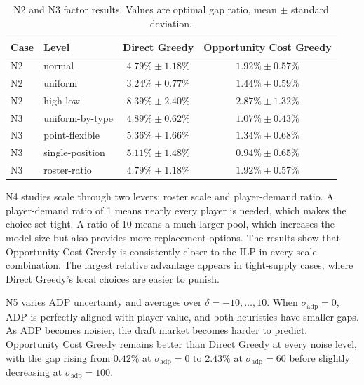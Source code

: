 \documentclass[10pt,a4paper]{article}
\begin{document}
\begin{table}[H]
\centering
\small
\setlength{\tabcolsep}{5pt}
\caption{N2 and N3 factor results. Values are optimal gap ratio, mean $\pm$ standard deviation.}
\label{tab:n2_n3}
\begin{tabular}{llcc}
\toprule
Case & Level & Direct Greedy & Opportunity Cost Greedy \\
\midrule
N2 & normal & $4.79\% \pm 1.18\%$ & $1.92\% \pm 0.57\%$ \\
N2 & uniform & $3.24\% \pm 0.77\%$ & $1.44\% \pm 0.59\%$ \\
N2 & high-low & $8.39\% \pm 2.40\%$ & $2.87\% \pm 1.32\%$ \\
\midrule
N3 & uniform-by-type & $4.89\% \pm 0.62\%$ & $1.07\% \pm 0.43\%$ \\
N3 & point-flexible & $5.36\% \pm 1.66\%$ & $1.34\% \pm 0.68\%$ \\
N3 & single-position & $5.11\% \pm 1.48\%$ & $0.94\% \pm 0.65\%$ \\
N3 & roster-ratio & $4.79\% \pm 1.18\%$ & $1.92\% \pm 0.57\%$ \\
\bottomrule
\end{tabular}
\end{table}

N4 studies scale through two levers: roster scale and player-demand ratio. A player-demand ratio of 1 means nearly every player is needed, which makes the choice set tight. A ratio of 10 means a much larger pool, which increases the model size but also provides more replacement options. The results show that Opportunity Cost Greedy is consistently closer to the ILP in every scale combination. The largest relative advantage appears in tight-supply cases, where Direct Greedy's local choices are easier to punish.

N5 varies ADP uncertainty and averages over $\delta=-10,\ldots,10$. When $\sigma_{\text{adp}}=0$, ADP is perfectly aligned with player value, and both heuristics have smaller gaps. As ADP becomes noisier, the draft market becomes harder to predict. Opportunity Cost Greedy remains better than Direct Greedy at every noise level, with the gap rising from $0.42\%$ at $\sigma_{\text{adp}}=0$ to $2.43\%$ at $\sigma_{\text{adp}}=60$ before slightly decreasing at $\sigma_{\text{adp}}=100$.
\end{document}
